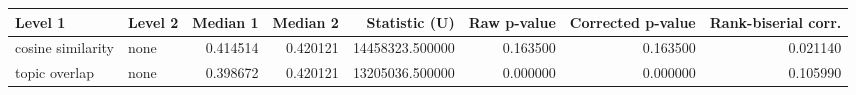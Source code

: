 \begin{tabular}{llrrrrrr}
\toprule
Level 1 & Level 2 & Median 1 & Median 2 & Statistic (U) & Raw p-value & Corrected p-value & Rank-biserial corr. \\
\midrule
cosine similarity & none & 0.414514 & 0.420121 & 14458323.500000 & 0.163500 & 0.163500 & 0.021140 \\
topic overlap & none & 0.398672 & 0.420121 & 13205036.500000 & 0.000000 & 0.000000 & 0.105990 \\
\bottomrule
\end{tabular}
